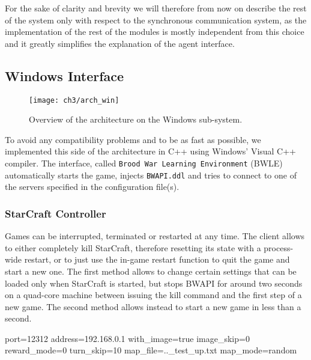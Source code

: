 For the sake of clarity and brevity we will therefore from now on describe the
rest of the system only with respect to the synchronous communication system, as
the implementation of the rest of the modules is mostly independent from this
choice and it greatly simplifies the explanation of the agent interface.

\subsection{Windows Interface}

\begin{figure}[h]
    \centering
    \texttt{[image: ch3/arch\_win]}
    \caption{Overview of the architecture on the Windows sub-system.}
    \label{fig:arch_win}
\end{figure}

To avoid any compatibility problems and to be as fast as possible, we
implemented this side of the architecture in C++ using Windows' Visual C++
compiler. The interface, called \texttt{Brood War Learning Environment} (BWLE)
automatically starts the game, injects \texttt{BWAPI.ddl} and tries to connect
to one of the servers specified in the configuration file(s).

\subsubsection{StarCraft Controller}

Games can be interrupted, terminated or restarted at any time. The client allows
to either completely kill StarCraft, therefore resetting its state with a
process-wide restart, or to just use the in-game restart function to quit the
game and start a new one. The first method allows to change certain settings
that can be loaded only when StarCraft is started, but stops BWAPI for around
two seconds on a quad-core machine between issuing the kill command and the
first step of a new game. The second method allows instead to start a new game
in less than a second. %

\begin{sflisting}[caption=Example of a BWLE's configuration file. Fields are not
  mandatory and have reasonable default values. Most of the available options
  are not shown., label=ls:config] 
[standard]
port=12312
address=192.168.0.1
with_image=true
image_skip=0
reward_mode=0
turn_skip=10
map_file=..\share\maps_test_up.txt
map_mode=random
\end{sflisting}

